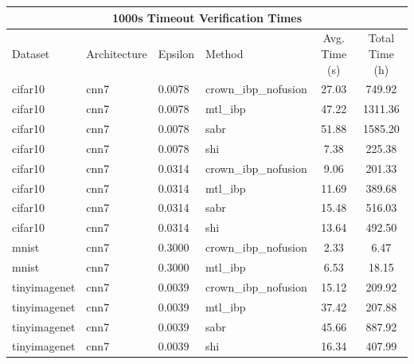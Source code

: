 \begin{tabular}{llllcc}
\toprule
\multicolumn{6}{c}{1000s Timeout Verification Times} \\
\midrule
Dataset & Architecture & Epsilon & Method & Avg. Time (s) & Total Time (h) \\
\midrule
cifar10 & cnn7 & 0.0078 & crown\_ibp\_nofusion & 27.03 & 749.92 \\
cifar10 & cnn7 & 0.0078 & mtl\_ibp & 47.22 & 1311.36 \\
cifar10 & cnn7 & 0.0078 & sabr & 51.88 & 1585.20 \\
cifar10 & cnn7 & 0.0078 & shi & 7.38 & 225.38 \\
cifar10 & cnn7 & 0.0314 & crown\_ibp\_nofusion & 9.06 & 201.33 \\
cifar10 & cnn7 & 0.0314 & mtl\_ibp & 11.69 & 389.68 \\
cifar10 & cnn7 & 0.0314 & sabr & 15.48 & 516.03 \\
cifar10 & cnn7 & 0.0314 & shi & 13.64 & 492.50 \\
mnist & cnn7 & 0.3000 & crown\_ibp\_nofusion & 2.33 & 6.47 \\
mnist & cnn7 & 0.3000 & mtl\_ibp & 6.53 & 18.15 \\
tinyimagenet & cnn7 & 0.0039 & crown\_ibp\_nofusion & 15.12 & 209.92 \\
tinyimagenet & cnn7 & 0.0039 & mtl\_ibp & 37.42 & 207.88 \\
tinyimagenet & cnn7 & 0.0039 & sabr & 45.66 & 887.92 \\
tinyimagenet & cnn7 & 0.0039 & shi & 16.34 & 407.99 \\
\bottomrule
\end{tabular}